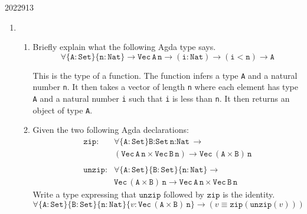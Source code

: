 \documentclass[10pt,\jkfside,a4paper]{article}
\begin{document}
\begin{enumerate}
\begin{examquestion}{2022}{9}{13}
\begin{enumerate}[label=(\alph*)]
\begin{enumerate}[label=(\roman*)]
            \end{enumerate}

            \item

            \begin{enumerate}[label=(\roman*)]

                \item Briefly explain what the following Agda type says.
                \[
                    \forall \{\texttt{A}: \texttt{Set}\}\{\texttt{n}: \texttt{Nat}\} \to \texttt{Vec}\, \texttt{A}\, \texttt{n} \to (\texttt{i} : \texttt{Nat}) \to (\texttt{i} < \texttt{n}) \to \texttt{A}
                \]

                This is the type of a function. The function infers a type \texttt{A} and a natural number \texttt{n}. It then takes a vector of length \texttt{n} where each element has type \texttt{A} and a natural number \texttt{i} such that \texttt{i} is less than \texttt{n}. It then returns an object of type \texttt{A}.

                \item Given the two following Agda declarations:
                \begin{align*}
                    \texttt{zip} :
                    & \forall \{\texttt{A}: \texttt{Set}\}{\texttt{B}: \texttt{Set}}{\texttt{n}: \texttt{Nat}} \to \\
                    & (\texttt{Vec}\, \texttt{A}\, \texttt{n} \times \texttt{Vec}\, \texttt{B}\, \texttt{n}) \to \texttt{Vec}\, (\texttt{A} \times \texttt{B})\, \texttt{n} \\
                    \\
                    \texttt{unzip} :
                    & \forall \{\texttt{A}: \texttt{Set}\}\{\texttt{B}: \texttt{Set}\}\{\texttt{n}: \texttt{Nat}\} \to \\
                    & \texttt{Vec}\, (\texttt{A} \times \texttt{B})\, \texttt{n} \to \texttt{Vec}\, \texttt{A}\, \texttt{n} \times \texttt{Vec}\, \texttt{B}\, \texttt{n}
                \end{align*}
                Write a type expressing that $\texttt{unzip}$ followed by $\texttt{zip}$ is the identity.
                \[
                    \forall \{\texttt{A}: \texttt{Set}\}\{\texttt{B}: \texttt{Set}\}\{\texttt{n}: \texttt{Nat}\}\{v: \texttt{Vec}\, (\texttt{A} \times \texttt{B})\, \texttt{n}\} \to (v \equiv \texttt{zip}(\texttt{unzip}(v)))
                \]

            \end{enumerate}

        \end{enumerate}

    \end{examquestion}

\end{enumerate}
\end{document}
